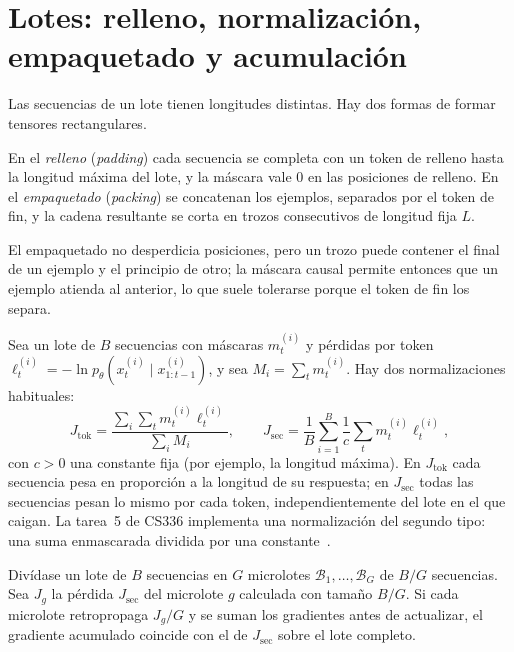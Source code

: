 \section{Lotes: relleno, normalización, empaquetado y acumulación}

Las secuencias de un lote tienen longitudes distintas. Hay dos formas de formar tensores rectangulares.

\begin{definicion}\label{def:relleno}
En el \emph{relleno} (\emph{padding}) cada secuencia se completa con un token de relleno hasta la longitud máxima del lote, y la máscara vale $0$ en las posiciones de relleno. En el \emph{empaquetado} (\emph{packing}) se concatenan los ejemplos, separados por el token de fin, y la cadena resultante se corta en trozos consecutivos de longitud fija $L$.
\end{definicion}

El empaquetado no desperdicia posiciones, pero un trozo puede contener el final de un ejemplo y el principio de otro; la máscara causal permite entonces que un ejemplo atienda al anterior, lo que suele tolerarse porque el token de fin los separa.

Sea un lote de $B$ secuencias con máscaras $m^{(i)}_t$ y pérdidas por token $\ell^{(i)}_t=-\ln p_\theta(x^{(i)}_t\mid x^{(i)}_{1:t-1})$, y sea $M_i=\sum_t m^{(i)}_t$. Hay dos normalizaciones habituales:
\[
J_{\mathrm{tok}}=\frac{\sum_{i}\sum_t m^{(i)}_t\ell^{(i)}_t}{\sum_i M_i},\qquad
J_{\mathrm{sec}}=\frac{1}{B}\sum_{i=1}^{B}\frac{1}{c}\sum_t m^{(i)}_t\ell^{(i)}_t,
\]
con $c>0$ una constante fija (por ejemplo, la longitud máxima). En $J_{\mathrm{tok}}$ cada secuencia pesa en proporción a la longitud de su respuesta; en $J_{\mathrm{sec}}$ todas las secuencias pesan lo mismo por cada token, independientemente del lote en el que caigan. La tarea~5 de CS336 implementa una normalización del segundo tipo: una suma enmascarada dividida por una constante~\cite[§4.2]{cs336a5}.

\begin{proposicion}\label{prop:acumulacion}
Divídase un lote de $B$ secuencias en $G$ microlotes $\mathcal{B}_1,\dots,\mathcal{B}_G$ de $B/G$ secuencias. Sea $J_g$ la pérdida $J_{\mathrm{sec}}$ del microlote $g$ calculada con tamaño $B/G$. Si cada microlote retropropaga $J_g/G$ y se suman los gradientes antes de actualizar, el gradiente acumulado coincide con el de $J_{\mathrm{sec}}$ sobre el lote completo.
\end{proposicion}


